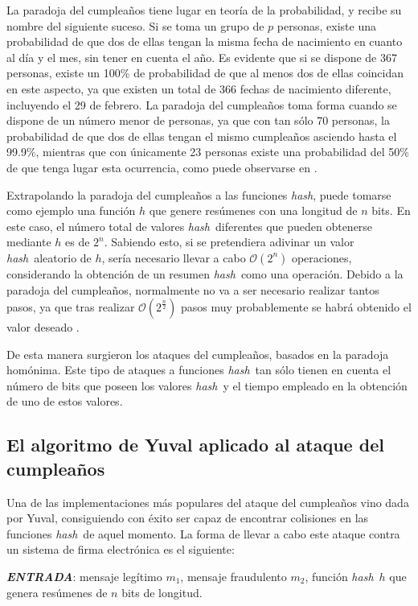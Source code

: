 \documentclass[12pt,spanish,listoffigures,listoftables]{tfgetsinf}
\newcommand{\hash}{\textit{hash}}
\begin{document}
La paradoja del cumpleaños tiene lugar en teoría de la probabilidad, y recibe su nombre del siguiente suceso. Si se toma un grupo de $p$ personas, existe una probabilidad de que dos de ellas tengan la misma fecha de nacimiento en cuanto al día y el mes, sin tener en cuenta el año. Es evidente que si se dispone de 367 personas, existe un 100\% de probabilidad de que al menos dos de ellas coincidan en este aspecto, ya que existen un total de 366 fechas de nacimiento diferente, incluyendo el 29 de febrero. La paradoja del cumpleaños toma forma cuando se dispone de un número menor de personas, ya que con tan sólo 70 personas, la probabilidad de que dos de ellas tengan el mismo cumpleaños asciendo hasta el 99.9\%, mientras que con únicamente 23 personas existe una probabilidad del 50\% de que tenga lugar esta ocurrencia, como puede observarse en \cite{birthday}.

Extrapolando la paradoja del cumpleaños a las funciones \hash, puede tomarse como ejemplo una función $h$ que genere resúmenes con una longitud de $n$ bits. En este caso, el número total de valores \hash~diferentes que pueden obtenerse mediante $h$ es de $2^n$. Sabiendo esto, si se pretendiera adivinar un valor \hash~aleatorio de $h$, sería necesario llevar a cabo $\mathcal{O}(2^n)$ operaciones, considerando la obtención de un resumen \hash~como una operación. Debido a la paradoja del cumpleaños, normalmente no va a ser necesario realizar tantos pasos, ya que tras realizar $\mathcal{O}(2^{\frac{n}{2}})$ pasos muy probablemente se habrá obtenido el valor deseado \cite{handbook}.

De esta manera surgieron los ataques del cumpleaños, basados en la paradoja homónima. Este tipo de ataques a funciones \hash~tan sólo tienen en cuenta el número de bits que poseen los valores \hash~y el tiempo empleado en la obtención de uno de estos valores.

\subsection{El algoritmo de Yuval aplicado al ataque del cumpleaños}

Una de las implementaciones más populares del ataque del cumpleaños vino dada por Yuval, consiguiendo con éxito ser capaz de encontrar colisiones en las funciones \hash~de aquel momento. La forma de llevar a cabo este ataque contra un sistema de firma electrónica es el siguiente:

\textit{\textbf{ENTRADA}}: mensaje legítimo $m_1$, mensaje fraudulento $m_2$, función \hash~$h$ que genera resúmenes de $n$ bits de longitud.
\\
\end{document}
